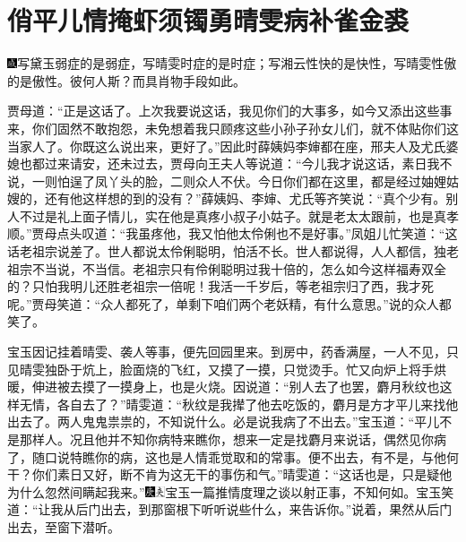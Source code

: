 

\chapter{俏平儿情掩虾须镯\hspace{.5em}勇晴雯病补雀金裘}

{\includegraphics[width=3mm]{../Images/00005}写黛玉弱症的是弱症，写晴雯时症的是时症；写湘云性快的是快性，写晴雯性傲的是傲性。彼何人斯？而具肖物手段如此。}

贾母道：``正是这话了。上次我要说这话，我见你们的大事多，如今又添出这些事来，你们固然不敢抱怨，未免想着我只顾疼这些小孙子孙女儿们，就不体贴你们这当家人了。你既这么说出来，更好了。''因此时薛姨妈李婶都在座，邢夫人及尤氏婆媳也都过来请安，还未过去，贾母向王夫人等说道：``今儿我才说这话，素日我不说，一则怕逞了凤丫头的脸，二则众人不伏。今日你们都在这里，都是经过妯娌姑嫂的，还有他这样想的到的没有？''薛姨妈、李婶、尤氏等齐笑说：``真个少有。别人不过是礼上面子情儿，实在他是真疼小叔子小姑子。就是老太太跟前，也是真孝顺。''贾母点头叹道：``我虽疼他，我又怕他太伶俐也不是好事。''凤姐儿忙笑道：``这话老祖宗说差了。世人都说太伶俐聪明，怕活不长。世人都说得，人人都信，独老祖宗不当说，不当信。老祖宗只有伶俐聪明过我十倍的，怎么如今这样福寿双全的？只怕我明儿还胜老祖宗一倍呢！我活一千岁后，等老祖宗归了西，我才死呢。''贾母笑道：``众人都死了，单剩下咱们两个老妖精，有什么意思。''说的众人都笑了。

宝玉因记挂着晴雯、袭人等事，便先回园里来。到房中，药香满屋，一人不见，只见晴雯独卧于炕上，脸面烧的飞红，又摸了一摸，只觉烫手。忙又向炉上将手烘暖，伸进被去摸了一摸身上，也是火烧。因说道：``别人去了也罢，麝月秋纹也这样无情，各自去了？''晴雯道：``秋纹是我撵了他去吃饭的，麝月是方才平儿来找他出去了。两人鬼鬼祟祟的，不知说什么。必是说我病了不出去。''宝玉道：``平儿不是那样人。况且他并不知你病特来瞧你，想来一定是找麝月来说话，偶然见你病了，随口说特瞧你的病，这也是人情乖觉取和的常事。便不出去，有不是，与他何干？你们素日又好，断不肯为这无干的事伤和气。''晴雯道：``这话也是，只是疑他为什么忽然间瞒起我来。''{\includegraphics[width=3mm]{../Images/00004}\includegraphics[width=3mm]{../Images/00012}\footnotesize \kaishu 宝玉一篇推情度理之谈以射正事，不知何如。}宝玉笑道：``让我从后门出去，到那窗根下听听说些什么，来告诉你。''说着，果然从后门出去，至窗下潜听。

